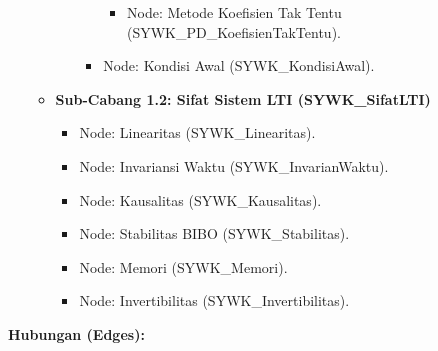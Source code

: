 \documentclass[
  letterpaper,
  DIV=11,
  numbers=noendperiod]{scrreprt}
\providecommand{\tightlist}{%
  \setlength{\itemsep}{0pt}\setlength{\parskip}{0pt}}
\begin{document}
\begin{itemize}
\begin{itemize}
\begin{itemize}
\begin{itemize}
        \begin{itemize}
        \tightlist
        \item
          Node: Metode Koefisien Tak Tentu
          (SYWK\_PD\_KoefisienTakTentu).
        \end{itemize}
      \item
        Node: Kondisi Awal (SYWK\_KondisiAwal).
      \end{itemize}
    \end{itemize}
  \item
    \textbf{Sub-Cabang 1.2: Sifat Sistem LTI (SYWK\_SifatLTI)}

    \begin{itemize}
    \tightlist
    \item
      Node: Linearitas (SYWK\_Linearitas).
    \item
      Node: Invariansi Waktu (SYWK\_InvarianWaktu).
    \item
      Node: Kausalitas (SYWK\_Kausalitas).
    \item
      Node: Stabilitas BIBO (SYWK\_Stabilitas).
    \item
      Node: Memori (SYWK\_Memori).
    \item
      Node: Invertibilitas (SYWK\_Invertibilitas).
    \end{itemize}
  \end{itemize}
\end{itemize}

\textbf{Hubungan (Edges):}
\end{document}
